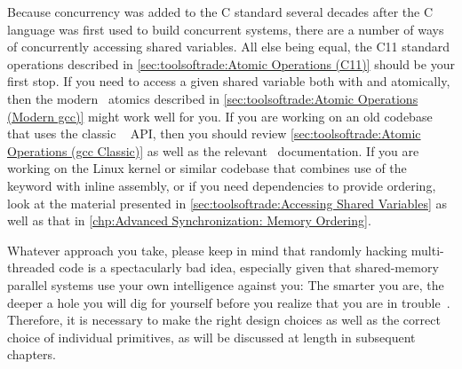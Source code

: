 \QuickQuizEnd

Because concurrency was added to the C standard several decades after
the C language was first used to build concurrent systems, there are
a number of ways of concurrently accessing shared variables.
All else being equal, the C11 standard operations described in
\cref{sec:toolsoftrade:Atomic Operations (C11)}
should be your first stop.
If you need to access a given shared variable both with 
and atomically, then the modern \GCC\ atomics described in
\cref{sec:toolsoftrade:Atomic Operations (Modern gcc)}
might work well for you.
If you are working on an old codebase that uses the classic \GCC\ 
API, then you should review
\cref{sec:toolsoftrade:Atomic Operations (gcc Classic)}
as well as the relevant \GCC\ documentation.
If you are working on the Linux kernel or similar codebase that
combines use of the  keyword with inline assembly,
or if you need dependencies to provide ordering, look at the material
presented in \cref{sec:toolsoftrade:Accessing Shared Variables}
as well as that in
\cref{chp:Advanced Synchronization: Memory Ordering}.

Whatever approach you take, please keep in mind that randomly hacking
multi-threaded code is a spectacularly bad idea, especially given that
shared-memory parallel systems use your own intelligence against you:
The smarter you are, the deeper a hole you will dig for yourself before
you realize that you are in trouble~\cite{DeadlockEmpire2016}.
Therefore, it is necessary to make the right design choices as well as
the correct choice of individual primitives,
as will be discussed at length in subsequent chapters.

